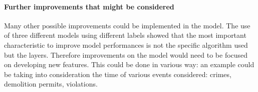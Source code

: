 \documentclass[a4paper,12pt]{article}
\begin{document}
\paragraph{Further improvements that might be considered}
Many other possible improvements could be implemented in the model. The use of three different models using different labels showed that the most important characteristic to improve model performances is not the specific algorithm used but the layers. Therefore improvements on the model would need to be focused on developing new features. This could be done in various way: an example could be taking into consideration the time of various events considered: crimes, demolition permits, violations.
\end{document}
